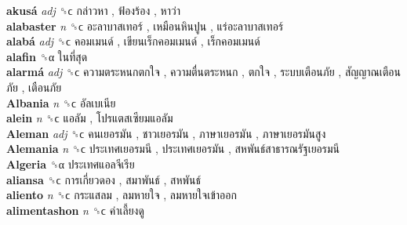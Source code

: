 \textbf{akusá} \emph{adj}  ␝ϲ   กล่าวหา ,  ฟ้องร้อง ,  หาว่า   \\
\textbf{alabaster} \emph{n}  ␝ϲ   อะลาบาสเทอร์ ,  เหมือนหินปูน ,  แร่อะลาบาสเทอร์   \\
\textbf{alabá} \emph{adj}  ␝ϲ   คอมเมนด์ ,  เขียนเร็กคอมเมนด์ ,  เร็กคอมเมนด์   \\
\textbf{alafin} ␝α   ในที่สุด   \\
\textbf{alarmá} \emph{adj}  ␝ϲ   ความตระหนกตกใจ ,  ความตื่นตระหนก ,  ตกใจ ,  ระบบเตือนภัย ,  สัญญาณเตือนภัย ,  เตือนภัย   \\
\textbf{Albania} \emph{n}  ␝ϲ   อัลเบเนีย   \\
\textbf{alein} \emph{n}  ␝ϲ   แอลัม ,  โปรแตสเซียมแอลัม   \\
\textbf{Aleman} \emph{adj}  ␝ϲ   คนเยอรมัน ,  ชาวเยอรมัน ,  ภาษาเยอรมัน ,  ภาษาเยอรมันสูง   \\
\textbf{Alemania} \emph{n}  ␝ϲ   ประเทศเยอรมนี ,  ประเทศเยอรมัน ,  สหพันธ์สาธารณรัฐเยอรมนี   \\
\textbf{Algeria} ␝α   ประเทศแอลจีเรีย   \\
\textbf{aliansa} ␝ϲ   การเกี่ยวดอง ,  สมาพันธ์ ,  สหพันธ์   \\
\textbf{aliento} \emph{n}  ␝ϲ   กระแสลม ,  ลมหายใจ ,  ลมหายใจเข้าออก   \\
\textbf{alimentashon} \emph{n}  ␝ϲ   ค่าเลี้ยงดู   \\
